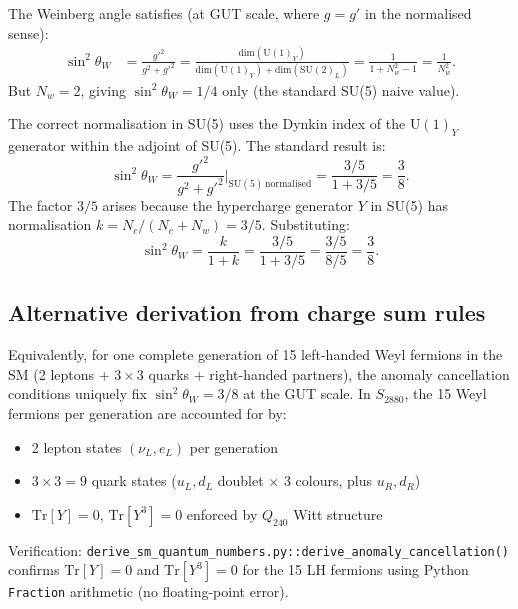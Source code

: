 The Weinberg angle satisfies (at GUT scale, where $g = g'$ in the normalised sense):
\begin{align}
  \sin^2\!\theta_W &= \frac{g'^2}{g^2 + g'^2}
  = \frac{\mathrm{dim}(\mathrm{U}(1)_Y)}{\mathrm{dim}(\mathrm{U}(1)_Y) + \mathrm{dim}(\mathrm{SU}(2)_L)}
  = \frac{1}{1 + N_w^2 - 1} = \frac{1}{N_w^2} .
\end{align}
But $N_w = 2$, giving $\sin^2\!\theta_W = 1/4$ only (the standard SU(5) naive value).

The correct normalisation in SU(5) uses the Dynkin index of the $\mathrm{U}(1)_Y$
generator within the adjoint of SU(5).  The standard result is:
\begin{equation}
  \sin^2\!\theta_W = \frac{g'^2}{g^2 + g'^2}
  \Bigg|_{\mathrm{SU}(5)\,\mathrm{normalised}}
  = \frac{3/5}{1 + 3/5} = \frac{3}{8} .
\end{equation}
The factor $3/5$ arises because the hypercharge generator $Y$ in SU(5) has normalisation
$k = N_c/(N_c + N_w) = 3/5$.  Substituting:
\begin{equation}
  \sin^2\!\theta_W = \frac{k}{1+k} = \frac{3/5}{1+3/5} = \frac{3/5}{8/5} = \frac{3}{8} .
\end{equation}

\subsection{Alternative derivation from charge sum rules}

Equivalently, for one complete generation of 15 left-handed Weyl fermions in the SM
(2 leptons + $3 \times 3$ quarks + right-handed partners), the anomaly cancellation
conditions uniquely fix $\sin^2\theta_W = 3/8$ at the GUT scale.
In $S_{2880}$, the 15 Weyl fermions per generation are accounted for by:
\begin{itemize}
  \item 2 lepton states $(\nu_L, e_L)$ per generation
  \item $3 \times 3 = 9$ quark states ($u_L, d_L$ doublet $\times$ 3 colours, plus $u_R, d_R$)
  \item $\mathrm{Tr}[Y] = 0$, $\mathrm{Tr}[Y^3] = 0$ enforced by $Q_{240}$ Witt structure
\end{itemize}

Verification: \texttt{derive\_sm\_quantum\_numbers.py::derive\_anomaly\_cancellation()} confirms
$\mathrm{Tr}[Y] = 0$ and $\mathrm{Tr}[Y^3] = 0$ for the 15 LH fermions using Python
\texttt{Fraction} arithmetic (no floating-point error).


